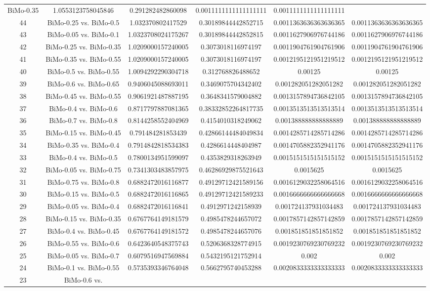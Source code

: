 \documentclass[a4paper,10pt]{article}
\begin{document}
\begin{landscape}
\begin{table}[!htp]
\begin{tabular}{cccccc}
BiMo-0.35&1.0553123758045846&0.291282482860098&0.0011111111111111111&0.0011111111111111111\\44&BiMo-0.25 vs. BiMo-0.5&1.032370802417529&0.30189844442852715&0.0011363636363636365&0.0011363636363636365\\43&BiMo-0.05 vs. BiMo-0.1&1.0323708024175267&0.30189844442852815&0.0011627906976744186&0.0011627906976744186\\42&BiMo-0.25 vs. BiMo-0.35&1.0209000157240005&0.3073018116974197&0.0011904761904761906&0.0011904761904761906\\41&BiMo-0.35 vs. BiMo-0.55&1.0209000157240005&0.3073018116974197&0.0012195121951219512&0.0012195121951219512\\40&BiMo-0.5 vs. BiMo-0.55&1.0094292290304718&0.312768826488652&0.00125&0.00125\\39&BiMo-0.6 vs. BiMo-0.65&0.9406045088693011&0.3469075704342402&0.001282051282051282&0.001282051282051282\\38&BiMo-0.45 vs. BiMo-0.55&0.9061921487887195&0.3648341579004882&0.0013157894736842105&0.0013157894736842105\\37&BiMo-0.4 vs. BiMo-0.6&0.8717797887081365&0.38332852264817735&0.0013513513513513514&0.0013513513513513514\\36&BiMo-0.7 vs. BiMo-0.8&0.8144258552404969&0.4154010318249062&0.001388888888888889&0.001388888888888889\\35&BiMo-0.15 vs. BiMo-0.45&0.791484281853439&0.42866144484049834&0.0014285714285714286&0.0014285714285714286\\34&BiMo-0.35 vs. BiMo-0.4&0.7914842818534383&0.4286614448404987&0.0014705882352941176&0.0014705882352941176\\33&BiMo-0.4 vs. BiMo-0.5&0.7800134951599097&0.4353829318263949&0.0015151515151515152&0.0015151515151515152\\32&BiMo-0.05 vs. BiMo-0.75&0.7341303483857975&0.46286929875521643&0.0015625&0.0015625\\31&BiMo-0.75 vs. BiMo-0.8&0.6882472016116877&0.49129712421589156&0.0016129032258064516&0.0016129032258064516\\30&BiMo-0.15 vs. BiMo-0.5&0.6882472016116865&0.49129712421589233&0.0016666666666666668&0.0016666666666666668\\29&BiMo-0.05 vs. BiMo-0.4&0.6882472016116841&0.4912971242158939&0.001724137931034483&0.001724137931034483\\28&BiMo-0.15 vs. BiMo-0.35&0.6767764149181579&0.4985478244657072&0.0017857142857142859&0.0017857142857142859\\27&BiMo-0.4 vs. BiMo-0.45&0.6767764149181572&0.4985478244657076&0.001851851851851852&0.001851851851851852\\26&BiMo-0.55 vs. BiMo-0.6&0.6423640548375743&0.5206368328774915&0.0019230769230769232&0.0019230769230769232\\25&BiMo-0.05 vs. BiMo-0.7&0.6079516947569884&0.5432195121752914&0.002&0.002\\24&BiMo-0.1 vs. BiMo-0.55&0.5735393346764048&0.5662795740453288&0.0020833333333333333&0.0020833333333333333\\23&BiMo-0.6 vs. 
\end{tabular}
\end{table}
\end{landscape}
\end{document}
